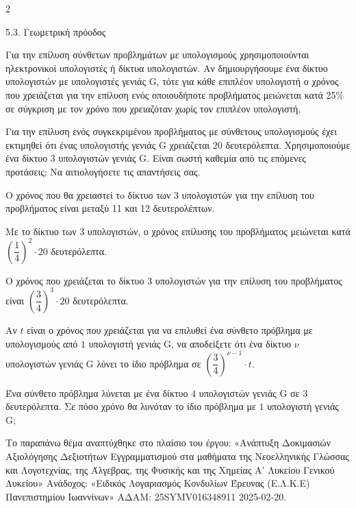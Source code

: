 \begin{ylh}{2}
    \item 5.3. Γεωμετρική πρόοδος
\end{ylh}
Για την επίλυση σύνθετων προβλημάτων με υπολογισμούς χρησιμοποιούνται ηλεκτρονικοί υπολογιστές ή δίκτυα υπολογιστών. Αν δημιουργήσουμε ένα δίκτυο υπολογιστών με υπολογιστές γενιάς G, τότε για κάθε επιπλέον υπολογιστή ο χρόνος που χρειάζεται για την επίλυση ενός οποιουδήποτε προβλήματος μειώνεται κατά 25\% σε σύγκριση με τον χρόνο που χρειαζόταν χωρίς τον επιπλέον υπολογιστή.

\begin{alist}
\item Για την επίλυση ενός συγκεκριμένου προβλήματος με σύνθετους υπολογισμούς έχει εκτιμηθεί ότι ένας υπολογιστής γενιάς G χρειάζεται $20$ δευτερόλεπτα. Χρησιμοποιούμε ένα δίκτυο $3$ υπολογιστών γενιάς G. Είναι σωστή καθεμία από τις επόμενες προτάσεις; Να αιτιολογήσετε τις απαντήσεις σας.

\begin{rlist}
\item Ο χρόνος που θα χρειαστεί τo δίκτυο των $3$ υπολογιστών για την επίλυση του προβλήματος είναι μεταξύ 11 και 12 δευτερολέπτων.
\item Με το δίκτυο των $3$ υπολογιστών, ο χρόνος επίλυσης του προβλήματος μειώνεται κατά $\left( \dfrac{1}{4} \right)^{2} \cdot 20$ δευτερόλεπτα.
\item Ο χρόνος που χρειάζεται το δίκτυο $3$ υπολογιστών για την επίλυση του προβλήματος είναι $\left( \dfrac{3}{4} \right)^{3} \cdot 20$ δευτερόλεπτα.
\end{rlist}
\item Αν $t$ είναι ο χρόνος που χρειάζεται για να επιλυθεί ένα σύνθετο πρόβλημα με υπολογισμούς από $1$ υπολογιστή γενιάς G, να αποδείξετε ότι ένα δίκτυο $\nu$ υπολογιστών γενιάς G λύνει το ίδιο πρόβλημα σε $\left( \dfrac{3}{4} \right)^{\nu - 1} \cdot t$.
\item Ένα σύνθετο πρόβλημα λύνεται με ένα δίκτυο $4$ υπολογιστών γενιάς G σε $3$ δευτερόλεπτα. Σε πόσο χρόνο θα λυνόταν το ίδιο πρόβλημα με $1$ υπολογιστή γενιάς G;

{\footnotesize Το παραπάνω θέμα αναπτύχθηκε στο πλαίσιο του έργου: «Ανάπτυξη Δοκιμασιών Αξιολόγησης Δεξιοτήτων Εγγραμματισμού στα μαθήματα της Νεοελληνικής Γλώσσας και Λογοτεχνίας, της Άλγεβρας, της Φυσικής και της Χημείας Α' Λυκείου Γενικού Λυκείου» Ανάδοχος: «Ειδικός Λογαριασμός Κονδυλίων Έρευνας (Ε.Λ.Κ.Ε) Πανεπιστημίου Ιωαννίνων» ΑΔΑΜ: 25SYMV016348911 2025-02-20.}
\end{alist}

